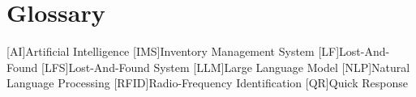 \chapter{Glossary}

\footnotesize
\DoubleSpacing

\begin{acronym}[ai]
	[AI]{Artificial Intelligence}
	[IMS]{Inventory Management System}
	[LF]{Lost-And-Found}
	[LFS]{Lost-And-Found System}
	[LLM]{Large Language Model}
	[NLP]{Natural Language Processing}
	[RFID]{Radio-Frequency Identification}
	[QR]{Quick Response}
\end{acronym}

